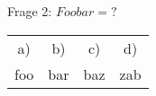 \documentclass[margin=0.2cm, varwidth]{standalone}
\begin{document}
\centering
Frage 2: $Foobar = ?$ \newline

\begin{tabular}{c c c c}
a) & b) & c) & d) \\
foo & bar & baz & zab \\
\end{tabular}
\end{document}
